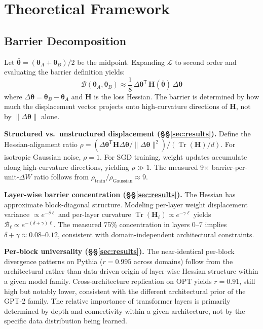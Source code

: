 \documentclass[11pt,a4paper]{article}
\begin{document}
\section{Theoretical Framework}\label{sec:theory}

\subsection{Barrier Decomposition}

Let $\bar{\bm{\theta}} = (\bm{\theta}_A + \bm{\theta}_B)/2$ be the midpoint. Expanding $\mathcal{L}$ to second order and evaluating the barrier definition yields:
\begin{equation}
\mathcal{B}(\bm{\theta}_A, \bm{\theta}_B) \approx \frac{1}{8}\,\Delta\bm{\theta}^{\mathsf{T}}\,\mathbf{H}(\bar{\bm{\theta}})\,\Delta\bm{\theta}
\label{eq:barrier_quadratic}
\end{equation}
where $\Delta\bm{\theta} = \bm{\theta}_B - \bm{\theta}_A$ and $\mathbf{H}$ is the loss Hessian. The barrier is determined by how much the displacement vector projects onto high-curvature directions of $\mathbf{H}$, not by $\|\Delta\bm{\theta}\|$ alone.

\textbf{Structured vs.\ unstructured displacement (\S\S\ref{sec:results}).}
Define the Hessian-alignment ratio $\rho = (\Delta\bm{\theta}^{\mathsf{T}}\mathbf{H}\Delta\bm{\theta} / \|\Delta\bm{\theta}\|^2) / (\operatorname{Tr}(\mathbf{H})/d)$. For isotropic Gaussian noise, $\rho = 1$. For SGD training, weight updates accumulate along high-curvature directions, yielding $\rho \gg 1$. The measured 9$\times$ barrier-per-unit-$\Delta W$ ratio follows from $\rho_{\text{train}} / \rho_{\text{Gaussian}} \approx 9$.

\textbf{Layer-wise barrier concentration (\S\S\ref{sec:results}).}
The Hessian has approximate block-diagonal structure. Modeling per-layer weight displacement variance $\propto e^{-\delta \ell}$ and per-layer curvature $\operatorname{Tr}(\mathbf{H}_\ell) \propto e^{-\gamma \ell}$ yields $\mathcal{B}_\ell \propto e^{-(\delta+\gamma)\ell}$. The measured 75\% concentration in layers 0--7 implies $\delta+\gamma \approx 0.08$--$0.12$, consistent with domain-independent architectural constraints.

\textbf{Per-block universality (\S\S\ref{sec:results}).}
The near-identical per-block divergence patterns on Pythia ($r = 0.995$ across domains) follow from the architectural rather than data-driven origin of layer-wise Hessian structure within a given model family. Cross-architecture replication on OPT yields $r = 0.91$, still high but notably lower, consistent with the different architectural prior of the GPT-2 family. The relative importance of transformer layers is primarily determined by depth and connectivity within a given architecture, not by the specific data distribution being learned.
\end{document}
